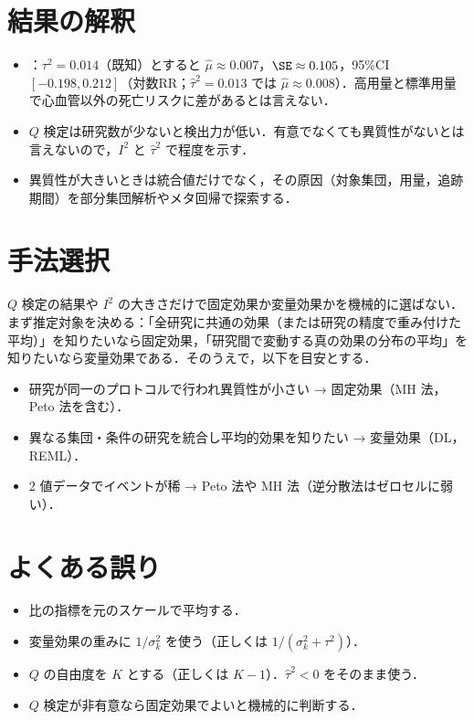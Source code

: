 \section{結果の解釈}\label{sec:15-interp}
\begin{itemize}
\item {}：$\tau^2=0.014$（既知）とすると $\hat\mu\approx0.007$，$\SE\approx0.105$，95\%CI $[-0.198,0.212]$（対数RR；$\hat\tau^2=0.013$ では $\hat\mu\approx0.008$）．高用量と標準用量で心血管以外の死亡リスクに差があるとは言えない．
\item $Q$ 検定は研究数が少ないと検出力が低い．有意でなくても異質性がないとは言えないので，$I^2$ と $\hat\tau^2$ で程度を示す．
\item 異質性が大きいときは統合値だけでなく，その原因（対象集団，用量，追跡期間）を部分集団解析やメタ回帰で探索する．
\end{itemize}

\section{手法選択}\label{sec:15-choice}
\Youchui $Q$ 検定の結果や $I^2$ の大きさだけで固定効果か変量効果かを機械的に選ばない．まず推定対象を決める：「全研究に共通の効果（または研究の精度で重み付けた平均）」を知りたいなら固定効果，「研究間で変動する真の効果の分布の平均」を知りたいなら変量効果である．そのうえで，以下を目安とする．
\begin{itemize}
\item 研究が同一のプロトコルで行われ異質性が小さい → 固定効果（MH 法，Peto 法を含む）．
\item 異なる集団・条件の研究を統合し平均的効果を知りたい → 変量効果（DL，REML）．
\item 2 値データでイベントが稀 → Peto 法や MH 法（逆分散法はゼロセルに弱い）．
\end{itemize}

\section{よくある誤り}\label{sec:15-err}
\begin{warnbox}
\begin{itemize}
\item 比の指標を元のスケールで平均する．
\item 変量効果の重みに $1/\sigma_k^2$ を使う（正しくは $1/(\sigma_k^2+\tau^2)$）．
\item $Q$ の自由度を $K$ とする（正しくは $K-1$）．$\hat\tau^2<0$ をそのまま使う．
\item $Q$ 検定が非有意なら固定効果でよいと機械的に判断する．
\end{itemize}
\end{warnbox}

